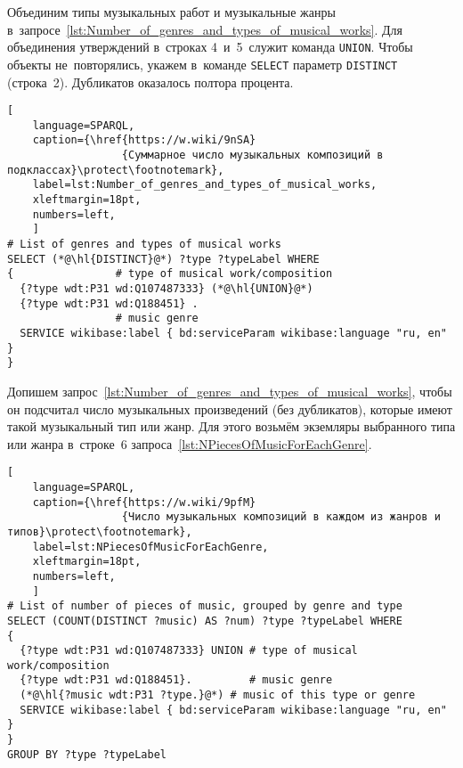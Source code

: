 Объединим типы музыкальных работ и музыкальные жанры 
в~запросе~\ref{lst:Number_of_genres_and_types_of_musical_works}. 
Для объединения утверждений в~строках 4~и~5~служит команда \lstinline|UNION|. 
Чтобы объекты не~повторялись, 
укажем в~команде \lstinline|SELECT| параметр \lstinline|DISTINCT| (строка~2). 
Дубликатов оказалось полтора процента. 

\newpage
\begin{lstlisting}[ 
    language=SPARQL,
    caption={\href{https://w.wiki/9nSA}
                  {Суммарное число музыкальных композиций в подклассах}\protect\footnotemark},
    label=lst:Number_of_genres_and_types_of_musical_works,
    xleftmargin=18pt,
    numbers=left,
    ]
# List of genres and types of musical works
SELECT (*@\hl{DISTINCT}@*) ?type ?typeLabel WHERE 
{                # type of musical work/composition
  {?type wdt:P31 wd:Q107487333} (*@\hl{UNION}@*)
  {?type wdt:P31 wd:Q188451} .
                 # music genre
  SERVICE wikibase:label { bd:serviceParam wikibase:language "ru, en" }
}
\end{lstlisting}%

Допишем запрос~\ref{lst:Number_of_genres_and_types_of_musical_works}, 
чтобы он подсчитал число музыкальных произведений (без дубликатов), 
которые имеют такой музыкальный тип или жанр. 
Для этого возьмём экземляры выбранного типа или жанра в~строке~6 
запроса~\ref{lst:NPiecesOfMusicForEachGenre}.
\begin{lstlisting}[ 
    language=SPARQL,
    caption={\href{https://w.wiki/9pfM}
                  {Число музыкальных композиций в каждом из жанров и типов}\protect\footnotemark},
    label=lst:NPiecesOfMusicForEachGenre,
    xleftmargin=18pt,
    numbers=left,
    ]
# List of number of pieces of music, grouped by genre and type
SELECT (COUNT(DISTINCT ?music) AS ?num) ?type ?typeLabel WHERE
{                
  {?type wdt:P31 wd:Q107487333} UNION # type of musical work/composition
  {?type wdt:P31 wd:Q188451}.         # music genre
  (*@\hl{?music wdt:P31 ?type.}@*) # music of this type or genre
  SERVICE wikibase:label { bd:serviceParam wikibase:language "ru, en" }
}
GROUP BY ?type ?typeLabel
\end{lstlisting}%

